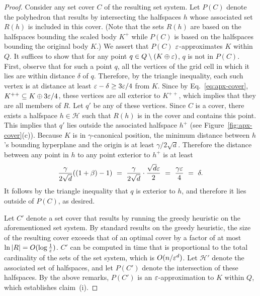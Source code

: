 \documentclass[11pt]{article}   \usepackage[letterpaper,hmargin=2.1cm,vmargin=3cm]{geometry}
\newcommand{\inv}[1]{\frac{1}{#1}}
\begin{document}
\begin{proof}
Consider any set cover $C$ of the resulting set system. Let $P(C)$ denote the polyhedron that results by intersecting the halfspaces $h$ whose associated set $R(h)$ is included in this cover. (Note that the sets $R(h)$ are based on the halfspaces bounding the scaled body $K^+$ while $P(C)$ is based on the halfspaces bounding the original body $K$.) We assert that $P(C)$ $\varepsilon$-approximates $K$ within $Q$. It suffices to show that for any point $q \in Q \setminus (K \oplus \varepsilon)$, $q$ is not in $P(C)$. First, observe that for such a point $q$, all the vertices of the grid cell in which it lies are within distance $\delta$ of $q$. Therefore, by the triangle inequality, each such vertex is at distance at least $\varepsilon - \delta \ge 3\varepsilon/4$ from $K$. Since by Eq.~\eqref{eq:apx-cover}, $K^{++} \subseteq K \oplus 3\varepsilon/4$, these vertices are all exterior to $K^{++}$, which implies that they are all members of $R$. Let $q'$ be any of these vertices. Since $C$ is a cover, there exists a halfspace $h \in \mathcal{H}$ such that $R(h)$ is in the cover and contains this point. This implies that $q'$ lies outside the associated halfspace $h^+$ (see Figure~\ref{fig:apx-cover}(c)). Because $K$ is in $\gamma$-canonical position, the minimum distance between $h$'s bounding hyperplane and the origin is at least $\gamma/2\sqrt{d}$. Therefore the distance between any point in $h$ to any point exterior to $h^+$ is at least
\[
	\frac{\gamma}{2\sqrt{d}} ( (1 + \beta) - 1)
		~ = ~ \frac{\gamma}{2\sqrt{d}} \cdot \frac{\sqrt{d}\varepsilon}{2}
		~ = ~ \frac{\gamma\varepsilon}{4}
		~ = ~ \delta.
\]
It follows by the triangle inequality that $q$ is exterior to $h$, and therefore it lies outside of $P(C)$, as desired.

Let $C'$ denote a set cover that results by running the greedy heuristic \cite{CLRS} on the aforementioned set system. By standard results on the greedy heuristic, the size of the resulting cover exceeds that of an optimal cover by a factor of at most $\ln |R| = O(\log \inv{\eps})$. $C'$ can be computed in time that is proportional to the total cardinality of the sets of the set system, which is $O(n/\varepsilon^d)$. Let $\mathcal{H}'$ denote the associated set of halfspaces, and let $P(C')$ denote the intersection of these halfspaces. By the above remarks, $P(C')$ is an $\varepsilon$-approximation to $K$ within $Q$, which establishes claim~(i).


\end{proof}
\end{document}
